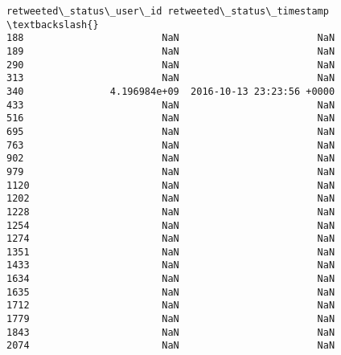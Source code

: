 \documentclass[11pt]{article}
\begin{document}
\begin{tcolorbox}[breakable, size=fbox, boxrule=.5pt, pad at break*=1mm, opacityfill=0]
\begin{Verbatim}[commandchars=\\\{\}]
      retweeted\_status\_user\_id retweeted\_status\_timestamp  \textbackslash{}
188                        NaN                        NaN
189                        NaN                        NaN
290                        NaN                        NaN
313                        NaN                        NaN
340               4.196984e+09  2016-10-13 23:23:56 +0000
433                        NaN                        NaN
516                        NaN                        NaN
695                        NaN                        NaN
763                        NaN                        NaN
902                        NaN                        NaN
979                        NaN                        NaN
1120                       NaN                        NaN
1202                       NaN                        NaN
1228                       NaN                        NaN
1254                       NaN                        NaN
1274                       NaN                        NaN
1351                       NaN                        NaN
1433                       NaN                        NaN
1634                       NaN                        NaN
1635                       NaN                        NaN
1712                       NaN                        NaN
1779                       NaN                        NaN
1843                       NaN                        NaN
2074                       NaN                        NaN


\end{Verbatim}
\end{tcolorbox}
\end{document}
